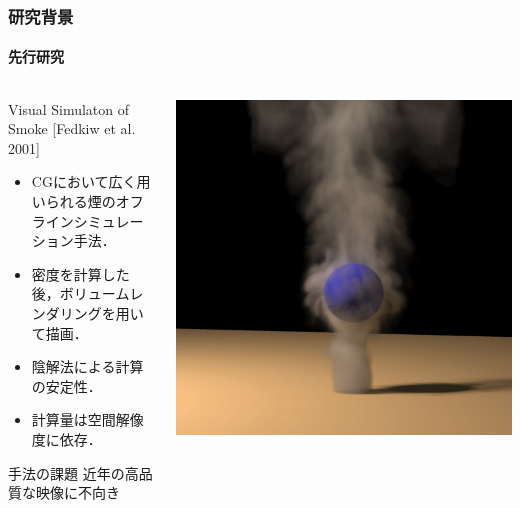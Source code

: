 \documentclass[aspectratio=169,dvipdfmx,hyperref={bookmarks=true}]{beamer}
\begin{document}

\begin{frame}
 \frametitle{研究背景}
   \framesubtitle{先行研究}
\begin{columns}[T]
	\begin{column}{0.6\linewidth}
	\begin{block}{Visual Simulaton of Smoke \cite{fedkiw} [Fedkiw et al. 2001]}
		\begin{itemize}
		\item CGにおいて広く用いられる煙のオフラインシミュレーション手法．
		\item 密度を計算した後，ボリュームレンダリングを用いて描画．
		\item 陰解法による計算の安定性．
		\item 計算量は空間解像度に依存．
	\end{itemize}
	\end{block}
	
	\begin{block}{手法の課題}
		 近年の高品質な映像に不向き
	\end{block}
    	\end{column}
	\begin{column}{0.4\linewidth}
	\includegraphics[width=0.8\linewidth]{images/vss-0017.png}
    	\end{column}
    \end{columns}
 \end{frame}
\end{document}
